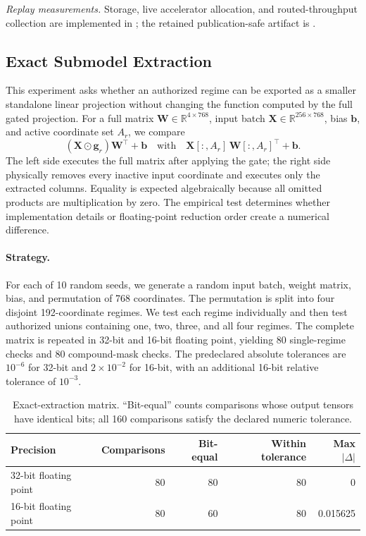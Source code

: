 \documentclass[11pt,a4paper]{article}
\newcommand{\bW}{\mathbf{W}}
\newcommand{\bg}{\mathbf{g}}
\begin{document}
\begin{sloppypar}
\noindent\textit{Replay measurements.} Storage, live accelerator
allocation, and routed-throughput collection are implemented in
; the retained
publication-safe artifact is
.
\end{sloppypar}

\subsection{Exact Submodel Extraction}
\label{sec:extraction}

This experiment asks whether an authorized regime can be exported as
a smaller standalone linear projection without changing the function
computed by the full gated projection.  For a full matrix
$\bW\in\mathbb{R}^{4\times768}$, input batch
$\mathbf{X}\in\mathbb{R}^{256\times768}$, bias $\mathbf{b}$, and active
coordinate set $A_r$, we compare
\begin{equation}
  (\mathbf{X}\odot\bg_r)\bW^\top+\mathbf{b}
  \quad\text{with}\quad
  \mathbf{X}[:,A_r]\,\bW[:,A_r]^\top+\mathbf{b}.
\end{equation}
The left side executes the full matrix after applying the gate; the
right side physically removes every inactive input coordinate and
executes only the extracted columns.  Equality is expected
algebraically because all omitted products are multiplication by
zero.  The empirical test determines whether implementation details
or floating-point reduction order create a numerical difference.

\paragraph{Strategy.}
For each of 10 random seeds, we generate a random input batch, weight
matrix, bias, and permutation of 768 coordinates.  The permutation is
split into four disjoint 192-coordinate regimes.  We test each regime
individually and then test authorized unions containing one, two,
three, and all four regimes.  The complete matrix is repeated in
32-bit and 16-bit floating point, yielding 80 single-regime checks and
80 compound-mask checks.  The predeclared absolute tolerances are
$10^{-6}$ for 32-bit and $2\times10^{-2}$ for 16-bit, with an
additional 16-bit relative tolerance of $10^{-3}$.

\begin{table}[ht]
\centering
\caption{Exact-extraction matrix.  ``Bit-equal'' counts comparisons
whose output tensors have identical bits; all 160 comparisons satisfy
the declared numeric tolerance.}
\label{tab:extraction-matrix}
\begin{tabular}{@{}lrrrr@{}}
\toprule
Precision & Comparisons & Bit-equal & Within tolerance & Max $|\Delta|$ \\
\midrule
32-bit floating point & 80 & 80 & 80 & 0 \\
16-bit floating point & 80 & 60 & 80 & 0.015625 \\
\bottomrule
\end{tabular}
\end{table}
\end{document}
